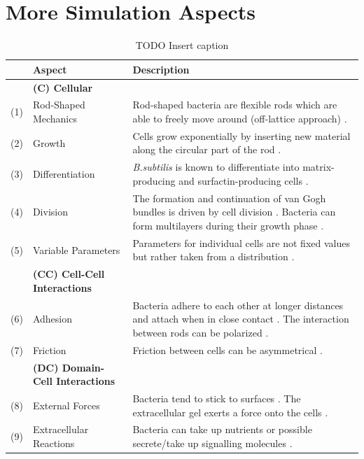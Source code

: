 \documentclass{article}
\begin{document}
\section{More Simulation Aspects}
\label{section:supplement-more-simulation-aspects}
\begin{table}[H]
    \centering
    \def\arraystretch{1.3}
    \begin{tabularx}{\textwidth}{c l X}
        &\textbf{Aspect} & \textbf{Description}\\
        \toprule
        &\textbf{(C) Cellular}\\
        \midrule
        (1) & Rod-Shaped Mechanics &
            Rod-shaped bacteria are flexible rods which are able to freely move around (off-lattice
            approach) \cite{Takeuchi2005,Ursell2014,Amir2014_2}.\\
        (2) & Growth &
            Cells grow exponentially by inserting new material along the circular part of the rod
            \cite{Robert2014,Takeuchi2005}.\\
        (3) & Differentiation &
            \textit{B.subtilis} is known to differentiate into matrix-producing and
            surfactin-producing cells \cite{vanGestel2015,Lpez2010}.\\
        (4) & Division &
            The formation and continuation of van Gogh bundles is driven by cell division
            \cite{vanGestel2015}.
            Bacteria can form multilayers during their growth phase \cite{Duvernoy2018}.\\
        (5) & Variable Parameters &
            Parameters for individual cells are not fixed values but rather taken from a
            distribution \cite{Koutsoumanis2013}.\\
        &\textbf{(CC) Cell-Cell Interactions}\\
        \midrule
        (6) & Adhesion &
            Bacteria adhere to each other at longer distances and attach when in close contact
            \cite{Verwey1947,Trejo2013}.
            The interaction between rods can be polarized \cite{Duvernoy2018}.\\
        (7) & Friction &
            Friction between cells \cite{Grant2014} can be asymmetrical \cite{Doumic2020}.\\
        &\textbf{(DC) Domain-Cell Interactions}\\
        \midrule
        (8) & External Forces &
            Bacteria tend to stick to surfaces \cite{vanLoosdrecht1989}.
            The extracellular gel exerts a force onto the cells \cite{Grant2014}.\\
        (9) & Extracellular Reactions &
            Bacteria can take up nutrients or possible secrete/take up signalling molecules
            \cite{Li2025}.\\
        \bottomrule
    \end{tabularx}
    \label{table:simulation-aspects-supplement}
    \caption{TODO Insert caption}
\end{table}
\end{document}
